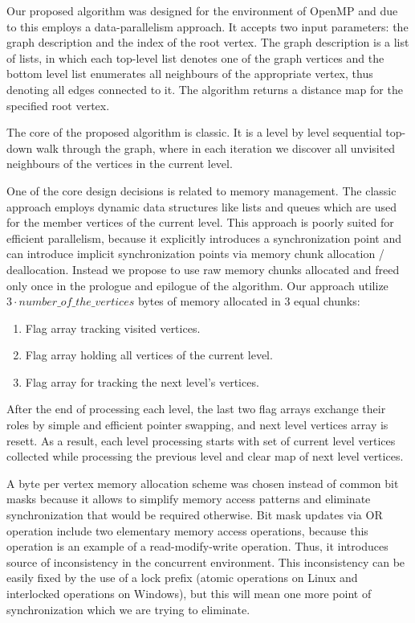 \documentclass[letterpaper]{article}
\begin{document}
			Our proposed algorithm was designed for the environment of OpenMP and due to this employs a data-parallelism approach. 
			It accepts two input parameters: the graph description and the index of the root vertex.
			The graph description is a list of lists, in which each top-level list denotes one of the graph vertices and the bottom level list enumerates all neighbours of the appropriate vertex, thus denoting all edges connected to it.
			The algorithm returns a distance map for the specified root vertex.
			
			The core of the proposed algorithm is classic.
			It is a level by level sequential top-down walk through the graph, where in each iteration we discover all unvisited neighbours of the vertices in the current level.
			
			One of the core design decisions is related to memory management.
			The classic approach employs dynamic data structures like lists and queues which are used for the member vertices of the current level.
			This approach is poorly suited for efficient parallelism, because it explicitly introduces a synchronization point and can introduce implicit synchronization points via memory chunk allocation / deallocation. 
			Instead we propose to use raw memory chunks allocated and freed only once in the prologue and epilogue of the algorithm.
			Our approach utilize $3 \cdot number\_of\_the\_vertices$ bytes of memory allocated in 3 equal chunks:
			\begin{enumerate}
				\item Flag array tracking visited vertices.
				\item Flag array holding all vertices of the current level.
				\item Flag array for tracking the next level's vertices.
			\end{enumerate}
			
			After the end of processing each level, the last two flag arrays exchange their roles by simple and efficient pointer swapping, and next level vertices array is resett.
			As a result, each level processing starts with set of current level vertices collected while processing the previous level and clear map of next level vertices. 

			A byte per vertex memory allocation scheme was chosen instead of common bit masks because it allows to simplify memory access patterns and eliminate synchronization that would be required otherwise.
			Bit mask updates via OR operation include two elementary memory access operations, because this operation is an example of a read-modify-write operation.
			Thus, it introduces source of inconsistency in the concurrent environment.
			This inconsistency can be easily fixed by the use of a lock prefix (atomic operations on Linux and interlocked operations on Windows), but this will mean one more point of synchronization which we are trying to eliminate.
			
\end{document}
